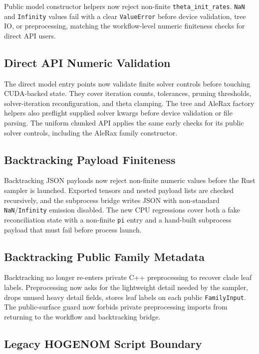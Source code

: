 \documentclass[11pt]{article}
\begin{document}
Public model constructor helpers now reject non-finite
\texttt{theta\_init\_rates}.  \texttt{NaN} and \texttt{Infinity} values fail
with a clear \texttt{ValueError} before device validation, tree IO, or
preprocessing, matching the workflow-level numeric finiteness checks for direct
API users.

\subsection{Direct API Numeric Validation}

The direct model entry points now validate finite solver controls before
touching CUDA-backed state.  They cover iteration counts, tolerances, pruning
thresholds, solver-iteration reconfiguration, and theta clamping.  The tree and
AleRax factory helpers also preflight supplied solver kwargs before device
validation or file parsing.  The uniform chunked API applies the same early
checks for its public solver controls, including the AleRax family constructor.

\subsection{Backtracking Payload Finiteness}

Backtracking JSON payloads now reject non-finite numeric values before the Rust
sampler is launched.  Exported tensors and nested payload lists are checked
recursively, and the subprocess bridge writes JSON with non-standard
\texttt{NaN}/\texttt{Infinity} emission disabled.  The new CPU regressions cover
both a fake reconciliation state with a non-finite \texttt{pi} entry and a
hand-built subprocess payload that must fail before process launch.

\subsection{Backtracking Public Family Metadata}

Backtracking no longer re-enters private C++ preprocessing to recover clade
leaf labels.  Preprocessing now asks for the lightweight detail needed by the
sampler, drops unused heavy detail fields, stores leaf labels on each public
\texttt{FamilyInput}.  The public-surface guard now forbids private
preprocessing imports from returning to the workflow and backtracking bridge.

\subsection{Legacy HOGENOM Script Boundary}
\end{document}

